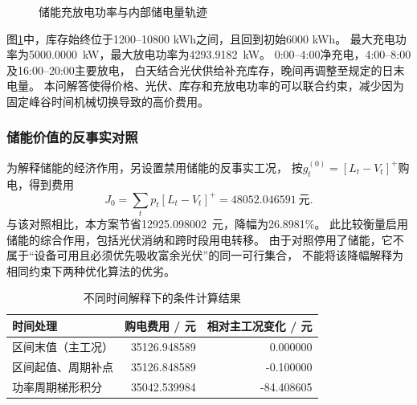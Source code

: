 \documentclass[UTF8,a4paper,12pt]{ctexart}
\newcommand{\pos}[1]{\left[#1\right]^+}
\newcommand{\NoStorageCost}{48052.046591}
\newcommand{\Saving}{12925.098002}
\newcommand{\SavingPercent}{26.8981}
\begin{document}
\begin{figure}[htbp]
  \centering
  \caption{储能充放电功率与内部储电量轨迹}\label{fig:storage}
\end{figure}

图\ref{fig:storage}中，库存始终位于1200--10800 kWh之间，且回到初始6000 kWh。
最大充电功率为5000.0000\ kW，最大放电功率为4293.9182\ kW。
0:00--4:00净充电，4:00--8:00及16:00--20:00主要放电，
白天结合光伏供给补充库存，晚间再调整至规定的日末电量。
本问解答使得价格、光伏、库存和充放电功率的可以联合约束，减少因为固定峰谷时间机械切换导致的高价费用。

\subsubsection{储能价值的反事实对照}
为解释储能的经济作用，另设置禁用储能的反事实工况，
按$g_t^{(0)}=\pos{L_t-V_t}$购电，得到费用
\begin{equation}
  J_0=\sum_t p_t\pos{L_t-V_t}=\NoStorageCost\ \text{元}.
  \label{eq:baseline}
\end{equation}
与该对照相比，本方案节省\Saving\ 元，降幅为\SavingPercent\%。
此比较衡量启用储能的综合作用，包括光伏消纳和跨时段用电转移。
由于对照停用了储能，它不属于“设备可用且必须优先吸收富余光伏”的同一可行集合，
不能将该降幅解释为相同约束下两种优化算法的优劣。


\begin{table}[htbp]
  \centering\small
  \caption{不同时间解释下的条件计算结果}\label{tab:time}
  \begin{tabular}{lrr}
    \toprule
    时间处理 & 购电费用 / 元 & 相对主工况变化 / 元\\
    \midrule
    区间末值（主工况） & 35126.948589 & 0.000000\\
    区间起值、周期补点 & 35126.848589 & -0.100000\\
    功率周期梯形积分 & 35042.539984 & -84.408605\\
    \bottomrule
  \end{tabular}
\end{table}
\end{document}
